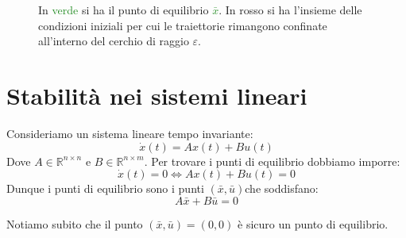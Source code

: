 \begin{figure}[h]
  \centering
  \caption{In \textcolor{ForestGreen}{verde} si ha il 
  punto di equilibrio \textcolor{ForestGreen}{\(\bar{x}\)}. 
  In rosso si ha l'insieme delle condizioni iniziali per cui le traiettorie rimangono
  confinate  all'interno del cerchio di raggio \(\varepsilon\).}
  \label{fig:assi-x1-x2}
\end{figure}
\section{Stabilità nei sistemi lineari}

Consideriamo un sistema lineare
tempo invariante:
\[\dot{x}(t) = Ax(t) + Bu(t)\]
Dove \(A \in \mathbb{R}^{n \times n}\) e 
\(B \in \mathbb{R}^{n \times m}\).
Per trovare i punti di equilibrio dobbiamo imporre:
\[\dot{x}(t) = 0 \Longleftrightarrow Ax(t) + Bu(t) = 0\]
Dunque i punti di equilibrio 
sono i punti \((\bar{x}, \bar{u})\)che soddisfano:
\[ 
A\bar{x} + B\bar{u} = 0
\]

Notiamo subito che il punto \((\bar{x}, \bar{u}) = (0,0)\) è sicuro un punto di equilibrio.

